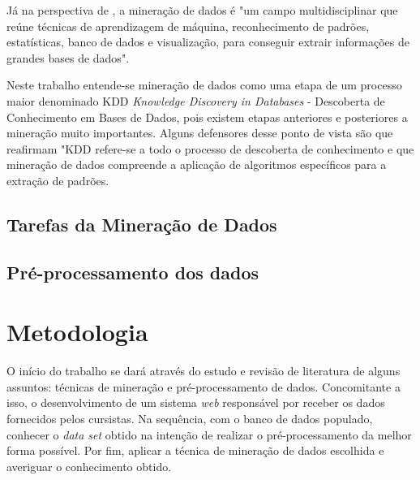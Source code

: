 \documentclass[projtg]{mdtufsm}
\begin{document}
Já na perspectiva de \cite{cabena}, a mineração de dados é "um campo multidisciplinar que reúne técnicas de aprendizagem de máquina, reconhecimento de padrões, estatísticas, banco de dados e visualização, para conseguir extrair informações de grandes bases de dados". 

Neste trabalho entende-se mineração de dados como uma etapa de um processo maior denominado KDD {\it Knowledge Discovery in Databases} - Descoberta de Conhecimento em Bases de Dados, pois existem etapas anteriores e posteriores a mineração muito importantes. Alguns defensores desse ponto de vista são \cite{fayyad} que reafirmam "KDD refere-se a todo o processo de descoberta de conhecimento e que mineração de dados compreende a aplicação de algoritmos específicos para a extração de padrões. 


\section{Tarefas da Mineração de Dados}



\section{Pré-processamento dos dados}








\chapter{Metodologia}
O início do trabalho se dará através do estudo e revisão de literatura de alguns assuntos: técnicas de mineração e pré-processamento de dados. Concomitante a isso, o desenvolvimento de um sistema {\it web} responsável por receber os dados fornecidos pelos cursistas. Na sequência, com o banco de dados populado, conhecer o \textit{data set} obtido na intenção de realizar o pré-processamento da melhor forma possível. Por fim, aplicar a técnica de mineração de dados escolhida e averiguar o conhecimento obtido. 
    
\end{document}
